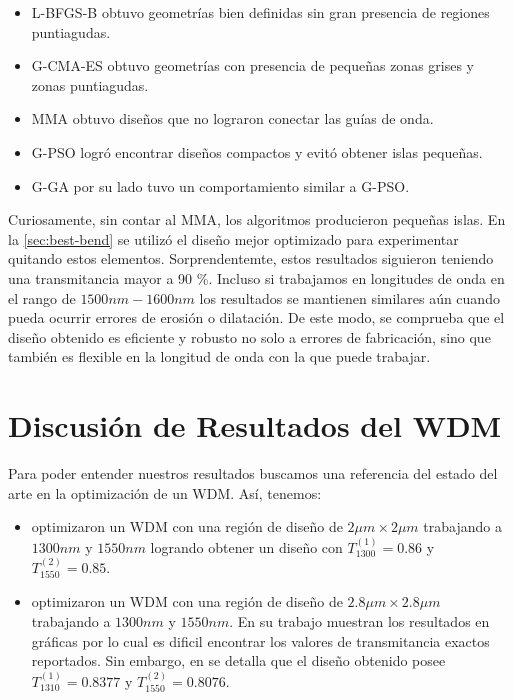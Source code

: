 \begin{itemize}
  \item L-BFGS-B obtuvo geometrías bien definidas sin gran presencia de regiones puntiagudas.

  \item G-CMA-ES obtuvo geometrías con presencia de pequeñas zonas grises y zonas puntiagudas.

  \item MMA obtuvo diseños que no lograron conectar las guías de onda.

  \item G-PSO logró encontrar diseños compactos y evitó obtener islas pequeñas.

  \item G-GA por su lado tuvo un comportamiento similar a G-PSO.

\end{itemize}

Curiosamente, sin contar al MMA, los algoritmos producieron pequeñas islas.
En la \autoref{sec:best-bend} se utilizó el diseño mejor optimizado para experimentar
quitando estos elementos. Sorprendentemte, estos resultados siguieron teniendo una transmitancia
mayor a 90 \%.
Incluso si trabajamos en longitudes de onda en el rango de $1500nm-1600nm$
los resultados se mantienen similares aún cuando pueda ocurrir errores de erosión o dilatación.
De este modo, se comprueba que el diseño obtenido es eficiente y robusto no solo a errores
de fabricación, sino que también es flexible en la longitud de onda con la que puede trabajar.

\section{Discusión de Resultados del WDM}

Para poder entender nuestros resultados buscamos una referencia del estado del arte en la optimización
de un WDM. Así, tenemos:

\begin{itemize}
  \item \cite{Christiansen2021} optimizaron un WDM con una región
  de diseño de $2 \mu m \times 2 \mu m$ trabajando a $1300 nm$ y $1550 nm$ logrando obtener un diseño
  con $T_{1300}^{(1)} = 0.86$ y $T_{1550}^{(2)} = 0.85$.

  \item \cite{Piggott2015} optimizaron un WDM con una región de diseño de $2.8 \mu m \times 2.8 \mu m$
    trabajando a $1300 nm$ y $1550 nm$. En su trabajo muestran los resultados en gráficas por lo cual
    es dificil encontrar los valores de transmitancia exactos reportados. Sin embargo, en
    \cite{Sigmund2016} se detalla que el diseño obtenido posee 
    $T_{1310}^{(1)} = 0.8377$ y $T_{1550}^{(2)} = 0.8076$.
\end{itemize}

